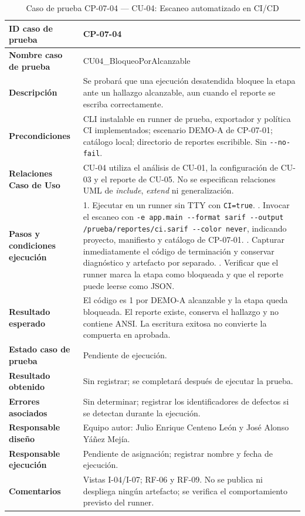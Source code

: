 \begin{table}[H]
\centering\small{}
\renewcommand{\arraystretch}{1.15}
\caption{Caso de prueba CP-07-04 --- CU-04: Escaneo automatizado en CI/CD}
\label{p7:tab:cp07_04}
\begin{tabularx}{\textwidth}{|P{4.15cm}|Y|}
\hline
\textbf{ID caso de prueba} & CP-07-04 \\ \hline
\textbf{Nombre caso de prueba} & CU04\_\allowbreak BloqueoPorAlcanzable \\ \hline
\textbf{Descripción} & Se probará que una ejecución desatendida bloquee la etapa ante un hallazgo alcanzable, aun cuando el reporte se escriba correctamente. \\ \hline
\textbf{Precondiciones} & CLI instalable en runner de prueba, exportador y política CI implementados; escenario DEMO-A de CP-07-01; catálogo local; directorio de reportes escribible. Sin \texttt{-\allowbreak -\allowbreak no-\allowbreak fail}. \\ \hline
\textbf{Relaciones Caso de Uso} & CU-04 utiliza el análisis de CU-01, la configuración de CU-03 y el reporte de CU-05. No se especifican relaciones UML de \textit{include}, \textit{extend} ni generalización. \\ \hline
\textbf{Pasos y condiciones ejecución} & 1. Ejecutar en un runner sin TTY con \texttt{CI=true}. . Invocar el escaneo con \texttt{-\allowbreak e app.\allowbreak main -\allowbreak -\allowbreak format sarif -\allowbreak -\allowbreak output /\allowbreak prueba/\allowbreak reportes/\allowbreak ci.\allowbreak sarif -\allowbreak -\allowbreak color never}, indicando proyecto, manifiesto y catálogo de CP-07-01. . Capturar inmediatamente el código de terminación y conservar diagnóstico y artefacto por separado. . Verificar que el runner marca la etapa como bloqueada y que el reporte puede leerse como JSON. \\ \hline
\textbf{Resultado esperado} & El código es 1 por DEMO-A alcanzable y la etapa queda bloqueada. El reporte existe, conserva el hallazgo y no contiene ANSI. La escritura exitosa no convierte la compuerta en aprobada. \\ \hline
\textbf{Estado caso de prueba} & Pendiente de ejecución. \\ \hline
\textbf{Resultado obtenido} & Sin registrar; se completará después de ejecutar la prueba. \\ \hline
\textbf{Errores asociados} & Sin determinar; registrar los identificadores de defectos si se detectan durante la ejecución. \\ \hline
\textbf{Responsable diseño} & Equipo autor: Julio Enrique Centeno León y José Alonso Yáñez Mejía. \\ \hline
\textbf{Responsable ejecución} & Pendiente de asignación; registrar nombre y fecha de ejecución. \\ \hline
\textbf{Comentarios} & Vistas I-04/I-07; RF-06 y RF-09. No se publica ni despliega ningún artefacto; se verifica el comportamiento previsto del runner. \\ \hline
\end{tabularx}
\end{table}
